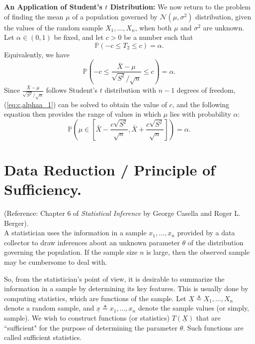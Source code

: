 \documentclass[a4paper,english,12pt]{article}
\begin{document}
\textbf{An Application of Student's $ t $ Distribution:} We now return to the problem of finding the mean $ \mu $ of a population governed by $ \mathcal{N}(\mu,\sigma^{2}) $ distribution, given the values of the random sample $ X_{1},\ldots,X_{n} $, when both $ \mu $ and $ \sigma^{2} $ are unknown. Let $ \alpha\in (0,1) $ be fixed, and let $ c>0 $ be a number such that
\begin{equation}
\mathbb{P}\left(-c \leq T_{2} \leq c\right)=\alpha.\label{eq:c,alphaa}
\end{equation} 
Equivalently, we have
\begin{equation}
\mathbb{P}\left(-c \leq \frac{\bar{X}-\mu}{\sqrt{S^{2}}/\sqrt{n}} \leq c \right)=\alpha. \label{eq:c,alphaa_1}
\end{equation}
Since $ \frac{\bar{X}-\mu}{\sqrt{S^{2}}/\sqrt{n}} $ follows Student's $ t $ distribution with $ n-1 $ degrees of freedom, (\ref*{eq:c,alphaa_1}) can be solved to obtain the value of $ c $, and the following equation then provides the range of values in which $ \mu $ lies with probability $ \alpha $:
\begin{equation}
\mathbb{P}\left(\mu \in \left[\bar{X}-\frac{c\sqrt{S^{2}}}{\sqrt{n}}, \bar{X}+\frac{c\sqrt{S^{2}}}{\sqrt{n}}\right] \right)=\alpha. \label{eq:c,alphaa_2}
\end{equation}

\section{Data Reduction / Principle of Sufficiency.}
(Reference: Chapter $ 6 $ of {\textit{Statistical Inference} by George Casella and Roger L. Berger}).\\

A statistician uses the information in a sample $  x_1, \dots, x_n  $ provided by a data collector to draw inferences about an unknown parameter $ \theta $ of the distribution governing the population. If the sample size $ n $ is large, then the observed sample may be cumbersome to deal with. 

So, from the statistician's point of view, it is desirable to summarize the information in a sample by determining its key features. This is usually done by computing statistics, which are functions of the sample. Let $ \underline{X} \triangleq X_1, \dots, X_n $ denote a random sample, and $ \underline{x} \triangleq x_1, \dots, x_n $ denote the sample values (or simply, sample).  We wish to construct functions (or statistics) $ T\left(\underline{X}\right) $ that are ``sufficient" for the purpose of determining the parameter $ \theta $. Such functions are called sufficient statistics.
\end{document}
